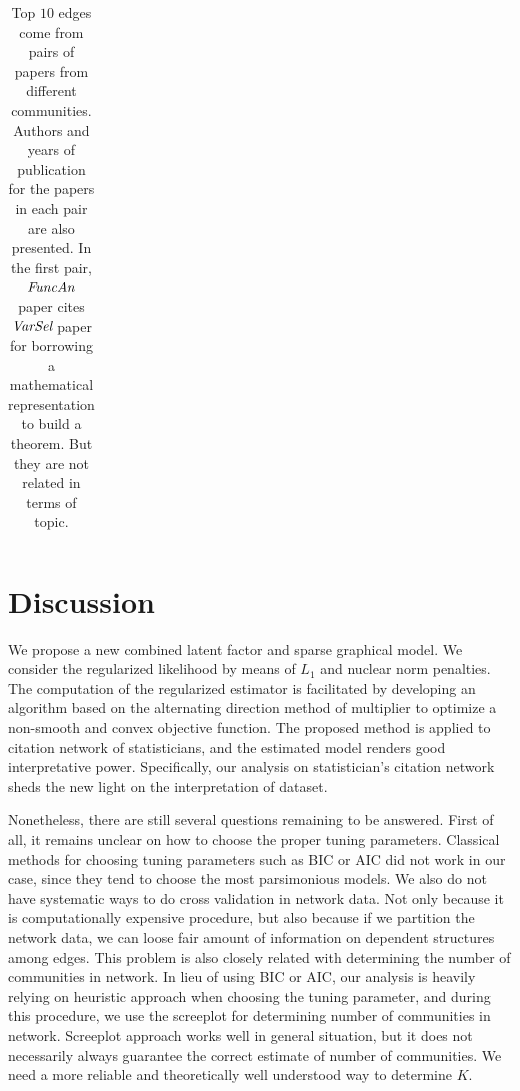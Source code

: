 \documentclass[AMS,STIX1COL]{WileyNJD-v2}
\begin{document}
{\begin{table}[htbp]
\begin{tabular}{ccccc}
\\ \hline
\end{tabular}
\caption{Top $10$ edges come from pairs of papers from different communities.
Authors and years of publication for the papers in each pair are also presented.
In the first pair, $\emph{FuncAn}$ paper cites $\emph{VarSel}$ paper for borrowing a mathematical representation to build a theorem. 
But they are not related in terms of topic.}
\label{tab:table2}
\end{table}

\section{Discussion}
\label{sec:Con}

We propose a new combined latent factor and sparse graphical model.
We consider the regularized likelihood by means of $L_1$ and nuclear norm penalties.
The computation of the regularized estimator is facilitated by developing an algorithm based on the alternating direction method of multiplier to optimize a non-smooth and convex objective function.
The proposed method is applied to citation network of statisticians, and the estimated model renders good interpretative power.
Specifically, our analysis on statistician's citation network sheds the new light on the interpretation of dataset.

Nonetheless, there are still several questions remaining to be answered.
First of all, it remains unclear on how to choose the proper tuning parameters.
Classical methods for choosing tuning parameters such as BIC or AIC did not work in our case, since they tend to choose the most parsimonious models.
We also do not have systematic ways to do cross validation in network data.
Not only because it is computationally expensive procedure, but also because if we partition the network data, we can loose fair amount of information on dependent structures among edges.
This problem is also closely related with determining the number of communities in network.
In lieu of using BIC or AIC, our analysis is heavily relying on heuristic approach when choosing the tuning parameter, and during this procedure, we use the screeplot for determining number of communities in network.
Screeplot approach works well in general situation, but it does not necessarily always guarantee the correct estimate of number of communities.
We need a more reliable and theoretically well understood way to determine $K$.

}
\end{document}
